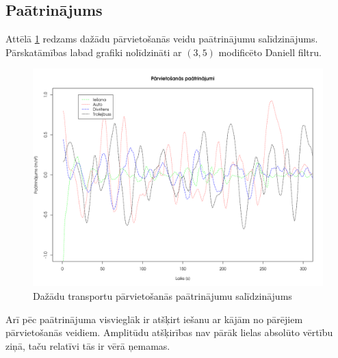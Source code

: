 \documentclass{ludis}
\begin{document}
\subsection{Paātrinājums}
Attēlā \ref{fig:acceleration_comparison} redzams dažādu pārvietošanās veidu paātrinājumu 
salīdzinājums. Pārskatāmības labad grafiki nolīdzināti ar $(3, 5)$ modificēto Daniell filtru.

\begin{figure}
  \centering
  \includegraphics[scale=0.5]{img/acceleration_comparison}
  \caption{Dažādu transportu pārvietošanās paātrinājumu salīdzinājums}
  \label{fig:acceleration_comparison}
\end{figure}

Arī pēc paātrinājuma visvieglāk ir atšķirt iešanu ar kājām no pārējiem pārvietošanās \linebreak 
veidiem. 
Amplitūdu atšķirības nav pārāk lielas absolūto vērtību ziņā, taču relatīvi tās ir vērā ņemamas.
\end{document}
